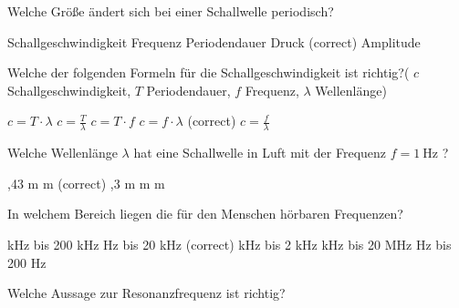 \documentclass[11pt]{exam}
\begin{document}
\setlength{\voffset}{-0.5in}
\setlength{\headsep}{5pt}

\hspace{2mm}
 \hspace{5mm}
\vspace{4mm}

\begin{questions}

\question Welche Größe ändert sich bei einer Schallwelle periodisch?

\begin{choices}
	\choice Schallgeschwindigkeit
	\choice Frequenz
	\choice Periodendauer
	\choice Druck (correct)
	\choice Amplitude
\end{choices}

\vspace{3mm}\question Welche der folgenden Formeln für die Schallgeschwindigkeit ist richtig?( \( c \) Schallgeschwindigkeit, \(T \) Periodendauer, \( f \) Frequenz, \( \lambda \) Wellenlänge)

\begin{choices}
	\choice \( c=T \cdot \lambda \)
	\choice \( c=\frac{T}{\lambda} \)
	\choice \( c=T \cdot f \)
	\choice \( c=f \cdot \lambda \) (correct)
	\choice \( c=\frac{f}{\lambda} \)
\end{choices}

\vspace{3mm}\question Welche Wellenlänge \( \lambda \) hat eine Schallwelle in Luft mit der Frequenz \( f = \mathrm{1~Hz} \) ?

\begin{choices}
	,43 m
	 m (correct)
	,3 m
	 m
	 m
\end{choices}

\vspace{3mm}\question In welchem Bereich liegen die für den Menschen hörbaren Frequenzen?

\begin{choices}
	 kHz bis 200 kHz
	 Hz bis 20 kHz (correct)
	 kHz bis 2 kHz
	 kHz bis 20 MHz
	 Hz bis 200 Hz
\end{choices}

\vspace{3mm}\question Welche Aussage zur Resonanzfrequenz ist richtig?


\end{questions}
\end{document}
